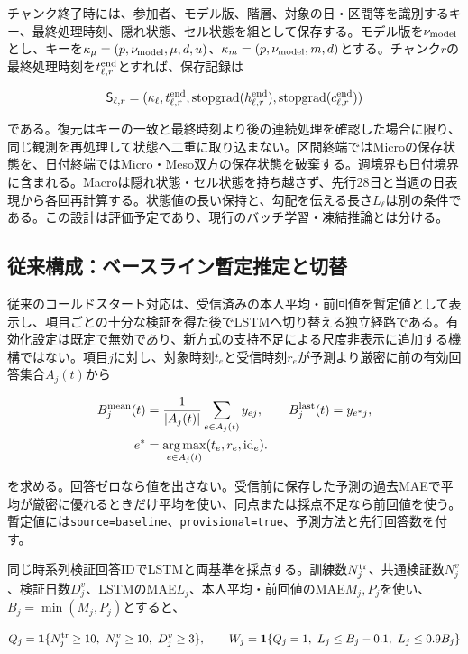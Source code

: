 チャンク終了時には、参加者、モデル版、階層、対象の日・区間等を識別するキー、最終処理時刻、隠れ状態、セル状態を組として保存する。モデル版を\(\nu_{\rm model}\)とし、キーを\(\kappa_\mu=(p,\nu_{\rm model},\mu,d,u)\)、\(\kappa_m=(p,\nu_{\rm model},m,d)\)とする。チャンク\(r\)の最終処理時刻を\(t_{\ell,r}^{\rm end}\)とすれば、保存記録は

\[
\mathsf S_{\ell,r}=
(\kappa_\ell,t_{\ell,r}^{\rm end},
\operatorname{stopgrad}(h_{\ell,r}^{\rm end}),
\operatorname{stopgrad}(c_{\ell,r}^{\rm end}))
\]

である。復元はキーの一致と最終時刻より後の連続処理を確認した場合に限り、同じ観測を再処理して状態へ二重に取り込まない。区間終端ではMicroの保存状態を、日付終端ではMicro・Meso双方の保存状態を破棄する。週境界も日付境界に含まれる。Macroは隠れ状態・セル状態を持ち越さず、先行28日と当週の日表現から各回再計算する。状態値の長い保持と、勾配を伝える長さ\(L_\ell\)は別の条件である。この設計は評価予定であり、現行のバッチ学習・凍結推論とは分ける。

\subsection{従来構成：ベースライン暫定推定と切替}

従来のコールドスタート対応は、受信済みの本人平均・前回値を暫定値として表示し、項目ごとの十分な検証を得た後でLSTMへ切り替える独立経路である。有効化設定は既定で無効であり、新方式の支持不足による尺度非表示に追加する機構ではない。項目\(j\)に対し、対象時刻\(t_e\)と受信時刻\(r_e\)が予測より厳密に前の有効回答集合\(A_j(t)\)から

\[
\begin{aligned}
B_j^{\rm mean}(t)&=\frac1{|A_j(t)|}\sum_{e\in A_j(t)}y_{ej},\qquad
B_j^{\rm last}(t)=y_{e^*j},\\
e^*&=\operatorname*{arg\,max}_{e\in A_j(t)}(t_e,r_e,\mathrm{id}_e).
\end{aligned}
\]

を求める。回答ゼロなら値を出さない。受信前に保存した予測の過去MAEで平均が厳密に優れるときだけ平均を使い、同点または採点不足なら前回値を使う。暫定値には\texttt{source=baseline}、\texttt{provisional=true}、予測方法と先行回答数を付す。

同じ時系列検証回答IDでLSTMと両基準を採点する。訓練数\(N_j^{\rm tr}\)、共通検証数\(N_j^v\)、検証日数\(D_j^v\)、LSTMのMAE\(L_j\)、本人平均・前回値のMAE\(M_j,P_j\)を使い、\(B_j=\min(M_j,P_j)\)とすると、

\[
Q_j=\mathbf1\{N_j^{\rm tr}\ge10,\ N_j^v\ge10,\ D_j^v\ge3\},\qquad
W_j=\mathbf1\{Q_j=1,\ L_j\le B_j-0.1,\ L_j\le0.9B_j\}
\]

